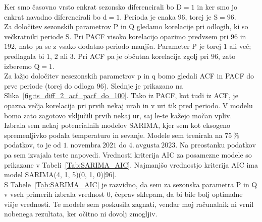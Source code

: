 \documentclass[a4paper, 11pt]{article}
\begin{document}
\noindent Ker smo časovno vrsto enkrat sezonsko diferencirali bo $\text{D} = 1$ in ker smo jo enkrat 
navadno diferencirali bo $\text{d} = 1$. Perioda je enaka $96$, torej je $\text{S} = 96$. \\

\noindent Za določitev sezonskih parametrov P in Q gledamo korelacije pri odlogih, ki so večkratniki periode S. Pri
PACF visoko korelacijo opazimo predvsem pri $96$ in $192$, nato pa se z vsako dodatno periodo manjša. Parameter P je torej 
$1$ ali več; predlagala bi $1$, $2$ ali $3$. 
Pri ACF pa je občutna korelacija zgolj pri $96$, zato izberemo $\text{Q} = 1$. \\

\noindent Za lažjo določitev nesezonskih parametrov p in q bomo gledali ACF in PACF do prve periode (torej do odloga 96). 
Slednje je prikazano na Slika~\ref{fig:ts_diff_2_acf_pacf_do_100}. Tako iz PACF, kot tudi iz ACF, je opazna večja korelacija
pri prvih nekaj urah in v uri tik pred periodo. V modelu bomo zato zagotovo vključili prvih nekaj ur, saj le-te kažejo močan vpliv. \\


\noindent Izbrala sem nekaj potencialnih modelov SARIMA, kjer sem kot eksogeno spremenljivko podala temperaturo in sevanje.
Modele sem trenirala na $75~\%$ podatkov, to je od $1.~\text{novembra}~2021$ do $4.~\text{avgusta}~2023$. Na preostanku podatkov 
pa sem izvajala teste napovedi. 
Vrednosti kriterija AIC za posamezne modele so prikazane v Tabeli~\ref{Tab:SARIMA_AIC}. 
Najmanjšo vrednostjo kriterija AIC ima model SARIMA(4, 1, 5)(0, 1, 0)[96]. \\

\noindent S Tabele~\ref{Tab:SARIMA_AIC} je razvidno, da sem za sezonska parametra P in Q v vseh primerih izbrala 
vrednost $0$, čeprav sklepam, da bi bile bolj optimalne višje vrednosti. Te modele sem poskusila zagnati, 
vendar moj računalnik ni vrnil nobenega rezultata, ker očitno ni dovolj zmogljiv. 
\end{document}
